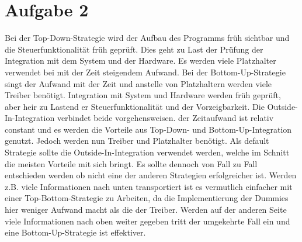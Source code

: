 \documentclass[a4paper]{report}
\begin{document}
\newpage\section*{Aufgabe 2}

Bei der Top-Down-Strategie wird der Aufbau des Programms früh sichtbar und die Steuerfunktionalität früh geprüft. Dies geht zu Last der Prüfung der Integration mit dem System und der Hardware. Es werden viele Platzhalter verwendet bei mit der Zeit steigendem Aufwand.
Bei der Bottom-Up-Strategie singt der Aufwand mit der Zeit und anstelle von Platzhaltern werden viele Treiber benötigt. Integration mit System und Hardware werden früh geprüft, aber heir zu Lastend er Steuerfunktionalität und der Vorzeigbarkeit.
Die Outside-In-Integration verbindet beide vorgehensweisen. der Zeitaufwand ist relativ constant und es werden die Vorteile aus Top-Down- und Bottom-Up-Integration genutzt. Jedoch werden nun Treiber und Platzhalter benötigt.
Als default Strategie sollte die Outside-In-Integration verwendet werden, welche im Schnitt die meisten Vorteile mit sich bringt. Es sollte dennoch von Fall zu Fall entschieden werden ob nicht eine der anderen Strategien erfolgreicher ist. Werden z.B. viele Informationen nach unten transportiert ist es vermutlich einfacher mit einer Top-Bottom-Strategie zu Arbeiten, da die Implementierung der Dummies hier weniger Aufwand macht als die der Treiber. Werden auf der anderen Seite viele Informationen nach oben weiter gegeben tritt der umgekehrte Fall ein und eine Bottom-Up-Strategie ist effektiver.
\end{document}
